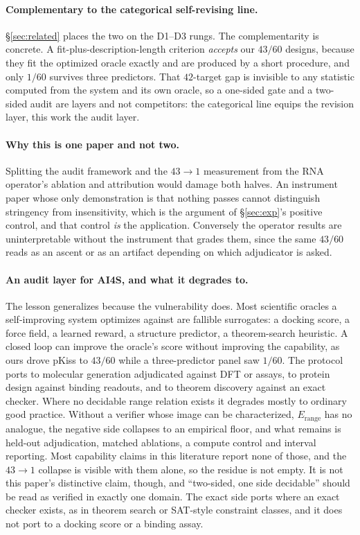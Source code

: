 \documentclass[11pt]{article}
\begin{document}
\paragraph{Complementary to the categorical self-revising line.} \S\ref{sec:related} places the two on the
D1--D3 rungs. The complementarity is concrete. A fit-plus-description-length criterion \emph{accepts} our
$43/60$ designs, because they fit the optimized oracle exactly and are produced by a short procedure, and only
$1/60$ survives three predictors. That $42$-target gap is invisible to any statistic computed from the system
and its own oracle, so a one-sided gate and a two-sided audit are layers and not competitors: the categorical
line equips the revision layer, this work the audit layer.

\paragraph{Why this is one paper and not two.} Splitting the audit framework and the $43\!\to\!1$ measurement
from the RNA operator's ablation and attribution would damage both halves. An instrument paper whose only
demonstration is that nothing passes cannot distinguish stringency from insensitivity, which is the argument
of \S\ref{sec:exp}'s positive control, and that control \emph{is} the application. Conversely the operator
results are uninterpretable without the instrument that grades them, since the same $43/60$ reads as an ascent
or as an artifact depending on which adjudicator is asked.

\paragraph{An audit layer for AI4S, and what it degrades to.} The lesson generalizes because the vulnerability
does. Most scientific oracles a self-improving system optimizes against are fallible surrogates: a docking
score, a force field, a learned reward, a structure predictor, a theorem-search heuristic. A closed loop can
improve the oracle's score without improving the capability, as ours drove pKiss to $43/60$ while a
three-predictor panel saw $1/60$. The protocol ports to molecular generation adjudicated against DFT or
assays, to protein design against binding readouts, and to theorem discovery against an exact checker. Where
no decidable range relation exists it degrades mostly to ordinary good practice. Without a verifier whose
image can be characterized, $E_{\mathrm{range}}$ has no analogue, the negative side collapses to an empirical
floor, and what remains is held-out adjudication, matched ablations, a compute control and interval reporting.
Most capability claims in this literature report none of those, and the $43\!\to\!1$ collapse is visible with
them alone, so the residue is not empty. It is not this paper's distinctive claim, though, and ``two-sided,
one side decidable'' should be read as verified in exactly one domain. The exact side ports where an exact
checker exists, as in theorem search or SAT-style constraint classes, and it does not port to a docking score
or a binding assay.
\end{document}
